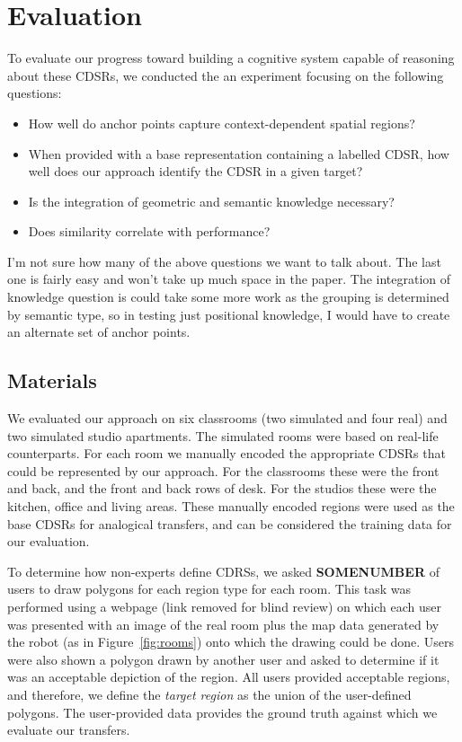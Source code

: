 \section{Evaluation}\label{sec:evaluation}

To evaluate our progress toward building a cognitive system capable of reasoning about these CDSRs, we conducted the an experiment focusing on the following questions:
\begin{itemize}
\item{How well do anchor points capture context-dependent spatial regions?}
\item{When provided with a base representation containing a labelled CDSR, how well does our approach identify the CDSR in a given target?}
\item{Is the integration of geometric and semantic knowledge necessary?}
\item{Does similarity correlate with performance?}
\end{itemize}

I'm not sure how many of the above questions we want to talk about. The last one is fairly easy and won't take up much space in the paper. The integration of knowledge question is could take some more work as the grouping is determined by semantic type, so in testing just positional knowledge,  I would have to create an alternate set of anchor points.

\subsection{Materials}

We evaluated our approach on six classrooms (two simulated and four real) and two simulated studio apartments. The simulated rooms were based on real-life counterparts. For each room we manually encoded the appropriate CDSRs that could be represented by our approach. For the classrooms these were the front and back, and the front and back rows of desk. For the studios these were the kitchen, office and living areas. These manually encoded regions were used as the base CDSRs for analogical transfers, and can be considered the training data for our evaluation. 

To determine how non-experts define CDRSs, we asked \textbf{SOMENUMBER} of users to draw polygons for each region type for each room. This task was performed using a webpage (link removed for blind review) on which each user was presented with an image of the real room plus the map data generated by the robot (as in Figure~\ref{fig:rooms}) onto which the drawing could be done. Users were also shown a polygon drawn by another user and asked to determine if it was an acceptable depiction of the region. All users provided acceptable regions, and therefore, we define the \textit{target region} as the union of the user-defined polygons. The user-provided data provides the ground truth against which we evaluate our transfers.

